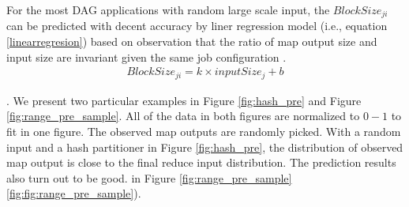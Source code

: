 For the most DAG applications with random large scale input, 
the $BlockSize_{ji}$ can be predicted with decent accuracy by liner regression model (i.e., equation \ref{linearregresion}) based on observation that the ratio of map output size and input size are invariant given the same job configuration \cite{ishuffle, predict}.
\begin{equation}
\label{linearregresion}
\begin{aligned}
	BlockSize_{ji} = k \times inputSize_j + b
\end{aligned}
\end{equation}

 \cite{apachespark}.  
\ifrevision
\reversemarginpar
{}
\fi
We present two particular examples in Figure \ref{fig:hash_pre} and Figure \ref{fig:range_pre_sample}. 
All of the data in both figures are normalized to $0-1$ to fit in one figure. 
The observed map outputs are randomly picked. 
With a random input and a hash partitioner in Figure \ref{fig:hash_pre}, the distribution of observed map output is close to the final reduce input distribution. 
The prediction results also turn out to be good. 
 \cite{apachespark} in Figure \ref{fig:range_pre_sample} 
 \ref{fig:fig:range_pre_sample}).

